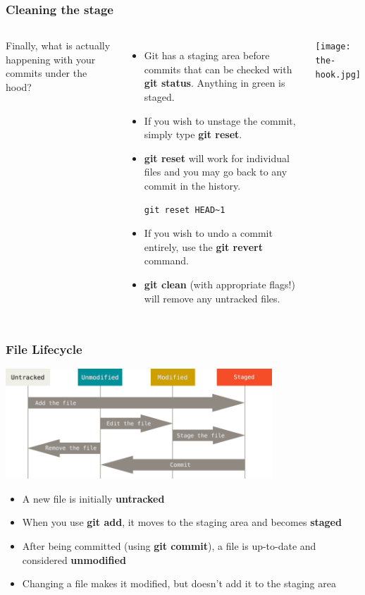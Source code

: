 \documentclass{beamer}
\begin{document}
\begin{frame}[fragile]
\frametitle{Cleaning the stage}
\begin{columns}
Finally, what is actually happening with your commits under the hood?
\begin{itemize}
\item Git has a staging area before commits that can be checked with \textbf{git status}. Anything in \textcolor{dkgreen}{green} is staged.
\item If you wish to unstage the commit, simply type \textbf{git reset}.
\item \textbf{git reset} will work for individual files and you may go back to any commit in the history.
        \begin{lstlisting}
git reset HEAD~1
        \end{lstlisting}
\item If you wish to undo a commit entirely, use the \textbf{git revert} command.
\item \textbf{git clean} (with appropriate flags!) will remove any untracked files.
\end{itemize}
\texttt{[image: the-hook.jpg]}
\end{columns}
\end{frame}

\begin{frame}
\frametitle{File Lifecycle}
\begin{center}
\includegraphics[width=0.75\textwidth]{lifecycle.png}
\end{center}
\begin{itemize}
\item A new file is initially \textbf{untracked}
\item When you use \textbf{git add}, it moves to the staging area and becomes \textbf{staged}
\item After being committed (using \textbf{git commit}), a file is up-to-date and considered \textbf{unmodified}
\item Changing a file makes it modified, but doesn't add it to the staging area
\end{itemize}
\end{frame}
\end{document}
